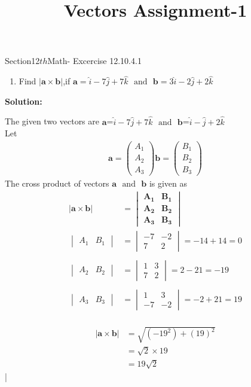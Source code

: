 \documentclass[12pt]{article}
\newcommand{\mydet}[1]{\ensuremath{\begin{vmatrix}#1\end{vmatrix}}}
\providecommand{\abs}[1]{\left\vert#1\right\vert}
\newcommand{\solution}{\noindent \textbf{Solution: }}
\newcommand{\myvec}[1]{\ensuremath{\begin{pmatrix}#1\end{pmatrix}}}
\let\vec\mathbf
\begin{document}
\begin{center}\title{\textbf{Vectors Assignment-1}}
\date{\vspace{-5ex}}
\maketitle
\end{center}
Section{12${th}$Math- Excercise 12.10.4.1}

\begin{enumerate}
\item Find $\abs{\vec{a}\times\vec{b}}$,if $\vec{a}=\hat{i}-7\hat{j}+7\hat{k}$ $\text{ and } $ $\vec{b}=3\hat{i}-2\hat{j}+2\hat{k}$
\end{enumerate}

\solution

The given two vectors are $\vec{a}$=$\hat{i}-7\hat{j}+7\hat{k}$  $\text{ and }$  $\vec{b}$=$\hat{i}-\hat{j}+2\hat{k}$ \\
 Let 
	\begin{align}
		\vec{a}=\myvec{A_1\\A_2\\A_3}
		\vec{b}=\myvec{B_1\\B_2\\B_3}
	\end{align}
The cross product of vectors $\vec{a}$ $\text{ and }$ $\vec{b}$ is given as
\begin{align}
	\abs{\vec{a}\times\vec{b}}&=\mydet{\vec{A_1}& \vec{B_1} \\ \vec{A_2} & \vec{B_2} \\\vec{A_3} & \vec{B_3}}\\
\mydet{A_1&B_1}&=\mydet{-7 & -2 \\ 7 & 2}=-14+14=0\\\\
\mydet{A_2&B_2}&=\mydet{1 & 3 \\ 7 & 2}=2-21=-19\\\\
\mydet{A_3&B_3}&=\mydet{1 & 3 \\ -7 & -2}=-2+21=19\\
\end{align}

\begin{align}
	\abs{\vec{a}\times\vec{b}}&=\sqrt{(-19^2)+(19)^2}\\
&=\sqrt{2}\times19\\
&=19\sqrt{2}
\end{align}|
\end{document}
